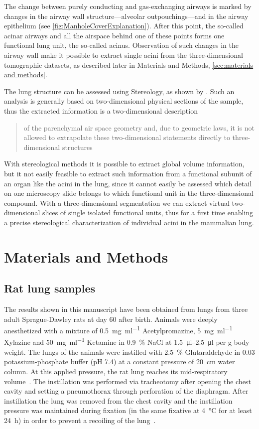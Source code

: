 \documentclass[twoside,paper=a4,abstract=true,english,DIV=calc]{scrartcl}
\begin{document}
The change between purely conducting and gas-exchanging airways is marked by changes in the airway wall structure---alveolar outpouchings---and in the airway epithelium (see \autoref{fig:ManholeCoverExplanation}). After this point, the so-called acinar airways and all the airspace behind one of these points forms one functional lung unit, the so-called acinus. Observation of such changes in the airway wall make it possible to extract single acini from the three-dimensional tomographic datasets, as described later in Materials and Methods, \autoref{sec:materials and methods}.

The lung structure can be assessed using Stereology, as shown by \citet{Hsia2010}. Such an analysis is generally based on two-dimensional physical sections of the sample, thus the extracted information is a two-dimensional description \blockquote[\cite{Tschanz2002}]{of the parenchymal air space geometry and, due to geometric laws, it is not allowed to extrapolate these two-dimensional statements directly to three-dimensional structures}. With stereological methods it is possible to extract global volume information, but it not easily feasible to extract such information from a functional subunit of an organ like the acini in the lung, since it cannot easily be assessed which detail on one microscopy slide belongs to which functional unit in the three-dimensional compound. With a three-dimensional segmentation we can extract virtual two-dimensional slices of single isolated functional units, thus for a first time enabling a precise stereological characterization of individual acini in the mammalian lung.

\section{Materials and Methods}
\label{sec:materials and methods}
\subsection{Rat lung samples}
The results shown in this manuscript have been obtained from lungs from three adult Sprague-Dawley rats at day 60 after birth. Animals were deeply anesthetized with a mixture of %
\SI{0.5}{\milli\gram\per\milli\litre} Acetylpromazine, %
\SI{5}{\milli\gram\per\milli\litre} Xylazine and %
\SI{50}{\milli\gram\per\milli\litre} Ketamine in %
\SI{0.9}{\percent} NaCl at \SIrange{1.5}{2.5}{\micro\litre} per \si{\gram} body weight. The lungs of the animals were instilled with \SI{2.5}{\percent} Glutaraldehyde in \SI{0.03}{\Molar} potassium-phosphate buffer (pH 7.4) at a constant pressure of \SI{20}{\centi\meter} water column. At this applied pressure, the rat lung reaches its mid-respiratory volume~\cite{Schittny1998}. The instillation was performed via tracheotomy after opening the chest cavity and setting a pneumothorax through perforation of the diaphragm. After instillation the lung was removed from the chest cavity and the instillation pressure was maintained during fixation (in the same fixative at \SI{4}{\celsius} for at least \SI{24}{\hour}) in order to prevent a recoiling of the lung~\cite{Tschanz2002}.
\end{document}
